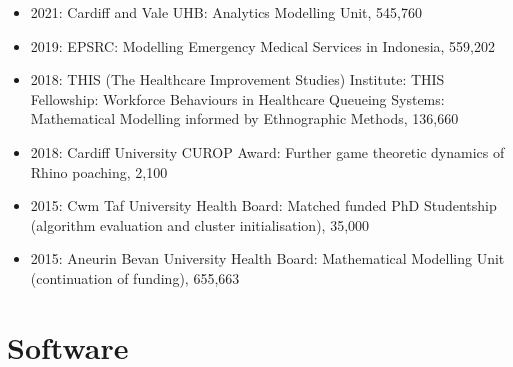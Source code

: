\documentclass[10pt]{article}
\begin{document}
\begin{itemize}

  \item 2021: Cardiff and Vale UHB: Analytics Modelling Unit, 545,760

  \item 2019: EPSRC: Modelling Emergency Medical Services in Indonesia, 559,202

  \item 2018: THIS (The Healthcare Improvement Studies) Institute: THIS Fellowship: Workforce Behaviours in Healthcare Queueing Systems: Mathematical Modelling informed by Ethnographic Methods, 136,660

  \item 2018: Cardiff University CUROP Award: Further game theoretic dynamics of Rhino poaching, 2,100

  \item 2015: Cwm Taf University Health Board: Matched funded PhD Studentship (algorithm evaluation and cluster initialisation), 35,000

  \item 2015: Aneurin Bevan University Health Board: Mathematical Modelling Unit (continuation of funding), 655,663

\end{itemize}

\section{Software}
\end{document}

